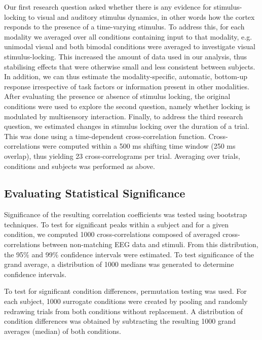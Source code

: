 Our first research question asked whether there is any evidence for
stimulus-locking to visual and auditory stimulus dynamics, in other words
how the cortex responds to the presence of a time-varying stimulus. To
address this, for each modality we averaged over all conditions containing
input to that modality, e.g. unimodal visual and both bimodal conditions
were averaged to investigate visual stimulus-locking. This increased the
amount of data used in our analysis, thus stabilising effects that were
otherwise small and less consistent between subjects. In addition, we can
thus estimate the modality-specific, automatic, bottom-up response
irrespective of task factors or information present in other modalities.
After evaluating the presence or absence of stimulus locking, the original
conditions were used to explore the second question, namely whether locking
is modulated by multisensory interaction. Finally, to address the third
research question, we estimated changes in stimulus locking over the
duration of a trial. This was done using a time-dependent cross-correlation
function. Cross-correlations were computed within a 500 ms shifting time
window (250 ms overlap), thus yielding 23 cross-correlograms per trial.
Averaging over trials, conditions and subjects was performed as above.

\subsection{Evaluating Statistical Significance}

Significance of the resulting correlation coefficients was tested using
bootstrap techniques. To test for significant peaks within a subject and
for a given condition, we computed 1000 cross-correlations composed of
averaged cross-correlations between non-matching EEG data and stimuli. From
this distribution, the 95\% and 99\% confidence intervals were estimated.
To test significance of the grand average, a distribution of 1000 medians
was generated to determine confidence intervals.



To test for significant condition differences, permutation testing was
used. For each subject, 1000 surrogate conditions were created by pooling
and randomly redrawing trials from both conditions without replacement. A
distribution of condition differences was obtained by subtracting the
resulting 1000 grand averages (median) of both conditions.


